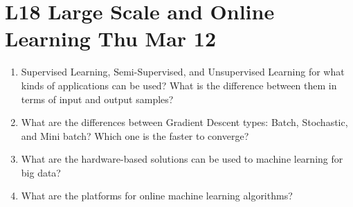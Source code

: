 \documentclass[12pt]{article}
\newenvironment{QandA}{\begin{enumerate}[label=\bfseries\arabic*.]\bfseries}
{\end{enumerate}}
\newenvironment{answered}{\par\normalfont\color{Sepia}}{}
\begin{document}
\section*{L18 Large Scale and Online Learning  \textemdash{} Thu Mar 12}
\begin{QandA}
    \item Supervised Learning, Semi-Supervised, and Unsupervised Learning 
          for what kinds of applications can be used? 
          What is the difference between them in terms of input and output samples?
    \begin{answered}
    \end{answered}
      
          
    \item What are the differences between Gradient Descent types: Batch, Stochastic, and Mini batch? 
          Which one is the faster to converge? 
    \begin{answered}
    \end{answered}
      
          
    \item What are the hardware-based solutions can be used to machine learning for big data? 
    \begin{answered}
    \end{answered}
    
    \item What are the platforms for online machine learning algorithms?
    \begin{answered}
    \end{answered}

\end{QandA}
\end{document}
